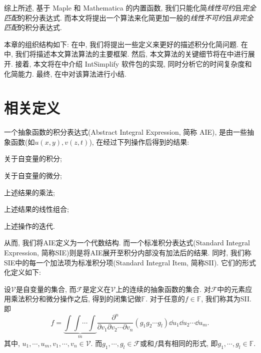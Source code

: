综上所述, 基于 Maple 和 Mathematica 的内置函数, 我们只能化简\emph{线性可约}且\emph{完全匹配}的积分表达式. 而本文将提出一个算法来化简更加一般的\emph{线性不可约}且\emph{非完全匹配}的积分表达式.

本章的组织结构如下: 在中, 我们将提出一些定义来更好的描述积分化简问题. 在中, 我们将描述本文算法算法的主要框架. 然后, 本文算法的关键细节将在中进行展开. 接着, 本文将在中介绍 IntSimplify 软件包的实现, 同时分析它的时间复杂度和化简能力. 最终, 在中对该算法进行小结.

\section{相关定义}\label{Definitions-03}
\begin{definition}
一个抽象函数的积分表达式(Abstract Integral Expression, 简称 AIE), 是由一些抽象函数(如$u(x,y),v(z,t)$), 在经过下列操作后得到的结果:
\begin{compactenum}[(1) ]
\item 关于自变量的积分;
\item 关于自变量的微分;
\item 上述结果的乘法;
\item 上述结果的线性组合;
\item 上述操作的迭代.
\end{compactenum}
\end{definition}

从而, 我们将AIE定义为一个代数结构. 而一个标准积分表达式(Standard Integral Expression, 简称SIE)则是将AIE展开至积分内部没有加法后的结果. 同时, 我们称SIE中的每一个加法项为标准积分项(Standard Integral Item, 简称SII). 它们的形式化定义如下:
\begin{definition}
设$\mathcal V$是自变量的集合, 而$\mathcal F$是定义在$\mathcal V$上的连续的抽象函数的集合. 对$\mathcal F$中的元素应用乘法\D 积分和微分操作之后, 得到的闭集记做$\mathbb F$. 对于任意的$f\in\mathbb{F}$, 我们称其为SII. 即
\begin{equation} 
f =\underbrace{\int\!\int\!\cdots\!\int}_m{ \frac{\partial^n}{\partial v_1 \partial v_2 \cdots \partial v_n} (g_1 g_2 \cdots g_l)\dd u_1 \dd u_2 \cdots \dd u_m}.
\label{int_form}
\end{equation} 
其中, $u_1,\cdots,u_m,v_1,\cdots,v_n \in \mathcal V$. 而$g_1,\cdots,g_l \in \mathcal F$或和$f$具有相同的形式, 即$g_1,\cdots,g_l \in \mathbb F$.
\end{definition}

